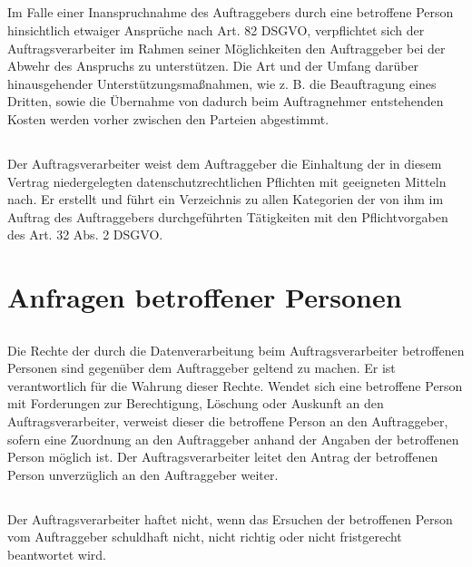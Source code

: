 \documentclass[10pt]{article}
\begin{document}
\subsection{} Im Falle einer Inanspruchnahme des Auftraggebers durch eine betroffene
Person hinsichtlich etwaiger Ansprüche nach Art. 82 DSGVO, verpflichtet sich
der Auftragsverarbeiter im Rahmen seiner Möglichkeiten den Auftraggeber bei der
Abwehr des Anspruchs zu unterstützen. Die Art und der Umfang darüber
hinausgehender Unterstützungsmaßnahmen, wie z. B. die Beauftragung eines
Dritten, sowie die Übernahme von dadurch beim Auftragnehmer entstehenden
Kosten werden vorher zwischen den Parteien abgestimmt.

\subsection{} Der Auftragsverarbeiter weist dem Auftraggeber die Einhaltung der in diesem
Vertrag niedergelegten datenschutzrechtlichen Pflichten mit geeigneten Mitteln
nach. Er erstellt und führt ein Verzeichnis zu allen Kategorien der von ihm im Auftrag
des Auftraggebers durchgeführten Tätigkeiten mit den Pflichtvorgaben des Art. 32
Abs. 2 DSGVO.

\section{Anfragen betroffener Personen}
\subsection{} Die Rechte der durch die Datenverarbeitung beim Auftragsverarbeiter betroffenen
Personen sind gegenüber dem Auftraggeber geltend zu machen. Er ist verantwortlich
für die Wahrung dieser Rechte. Wendet sich eine betroffene Person mit Forderungen
zur Berechtigung, Löschung oder Auskunft an den Auftragsverarbeiter, verweist
dieser die betroffene Person an den Auftraggeber, sofern eine Zuordnung an den
Auftraggeber anhand der Angaben der betroffenen Person möglich ist. Der
Auftragsverarbeiter leitet den Antrag der betroffenen Person unverzüglich an den
Auftraggeber weiter.

\subsection{} Der Auftragsverarbeiter haftet nicht, wenn das Ersuchen der betroffenen Person vom
Auftraggeber schuldhaft nicht, nicht richtig oder nicht fristgerecht beantwortet wird.
\end{document}
